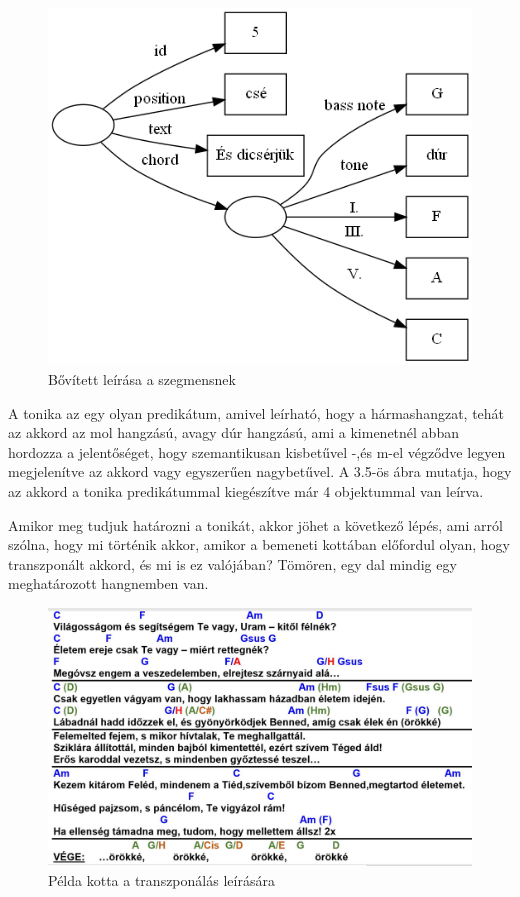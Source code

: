 \begin{figure}[h]
	\includegraphics[scale=0.5]{images/img_src/rdf_graph_4.png}
	\caption{Bővített leírása a szegmensnek}
	\label{fig:graph4}
\end{figure}
A tonika az egy olyan predikátum, amivel leírható, hogy a hármashangzat, tehát az akkord az mol hangzású, avagy dúr hangzású, ami a kimenetnél abban hordozza a jelentőséget, hogy szemantikusan kisbetűvel -,és m-el végződve legyen megjelenítve az akkord vagy egyszerűen nagybetűvel. A 3.5-ös ábra mutatja, hogy az akkord a tonika predikátummal kiegészítve már 4 objektummal van leírva.
\par
Amikor meg tudjuk határozni a tonikát, akkor jöhet a következő lépés, ami arról szólna, hogy mi történik akkor, amikor a bemeneti kottában előfordul olyan, hogy transzponált akkord, és mi is ez valójában? Tömören, egy dal mindig egy meghatározott hangnemben van.
\newpage
\begin{figure}[h]
	\includegraphics[scale=0.3]{images/samples/27_zsoltar.jpg}
	\caption{Példa kotta a transzponálás leírására}
	\label{fig:song2}
\end{figure}
